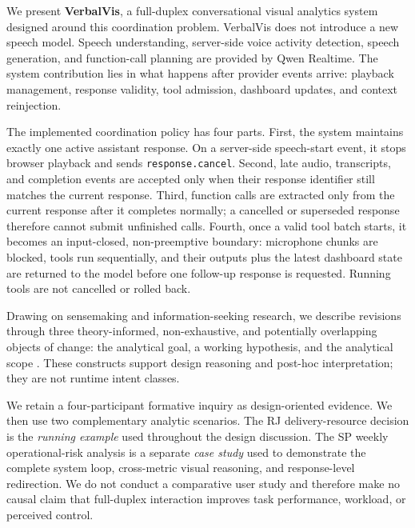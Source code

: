 \documentclass[journal]{IEEEtran}
\begin{document}
We present \textbf{VerbalVis}, a full-duplex conversational visual analytics system designed around this coordination problem. VerbalVis does not introduce a new speech model. Speech understanding, server-side voice activity detection, speech generation, and function-call planning are provided by Qwen Realtime. The system contribution lies in what happens after provider events arrive: playback management, response validity, tool admission, dashboard updates, and context reinjection.

The implemented coordination policy has four parts. First, the system maintains exactly one active assistant response. On a server-side speech-start event, it stops browser playback and sends \texttt{response.cancel}. Second, late audio, transcripts, and completion events are accepted only when their response identifier still matches the current response. Third, function calls are extracted only from the current response after it completes normally; a cancelled or superseded response therefore cannot submit unfinished calls. Fourth, once a valid tool batch starts, it becomes an input-closed, non-preemptive boundary: microphone chunks are blocked, tools run sequentially, and their outputs plus the latest dashboard state are returned to the model before one follow-up response is requested. Running tools are not cancelled or rolled back.

Drawing on sensemaking and information-seeking research, we describe revisions through three theory-informed, non-exhaustive, and potentially overlapping objects of change: the analytical goal, a working hypothesis, and the analytical scope \cite{pirolli2005sensemaking,klein2007dataframe,bates1989berrypicking,battle2019characterizing}. These constructs support design reasoning and post-hoc interpretation; they are not runtime intent classes.

We retain a four-participant formative inquiry as design-oriented evidence. We then use two complementary analytic scenarios. The RJ delivery-resource decision is the \emph{running example} used throughout the design discussion. The SP weekly operational-risk analysis is a separate \emph{case study} used to demonstrate the complete system loop, cross-metric visual reasoning, and response-level redirection. We do not conduct a comparative user study and therefore make no causal claim that full-duplex interaction improves task performance, workload, or perceived control.
\end{document}

